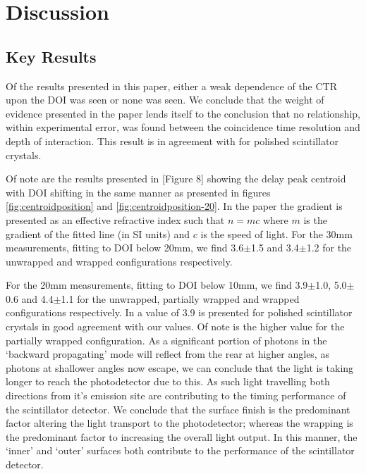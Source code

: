 \section{Discussion}
\subsection{Key Results}
Of the results presented in this paper, either a weak dependence of the CTR upon the DOI was seen or none was seen. We conclude that the weight of evidence presented in the paper lends itself to the conclusion that no relationship, within experimental error, was found between the coincidence time resolution and depth of interaction. This result is in agreement with \cite{Bircher_Shao_2012} for polished scintillator crystals. 


Of note are the results presented in [Figure 8]\cite{Moses_Derenzo_1999} showing the delay peak centroid with DOI shifting in the same manner as presented in figures \ref{fig:centroidposition} and \ref{fig:centroidposition-20}. In the paper the gradient is presented as an effective refractive index such that $n=mc$ where $m$ is the gradient of the fitted line (in SI units) and $c$ is the speed of light. For the 30mm measurements, fitting to DOI below 20mm, we find 3.6$\pm$1.5 and 3.4$\pm$1.2 for the unwrapped and wrapped configurations respectively. 


For the 20mm measurements, fitting to DOI below 10mm, we find 3.9$\pm$1.0, 5.0$\pm$0.6 and 4.4$\pm$1.1 for the unwrapped, partially wrapped and wrapped configurations respectively. In \cite{Moses_Derenzo_1999} a value of 3.9 is presented for polished scintillator crystals in good agreement with our values. Of note is the higher value for the partially wrapped configuration. As a significant portion of photons in the `backward propagating' mode will reflect from the rear at higher angles, as photons at shallower angles now escape, we can conclude that the light is taking longer to reach the photodetector due to this. As such light travelling both directions from it's emission site are contributing to the timing performance of the scintillator detector. We conclude that the surface finish is the predominant factor altering the light transport to the photodetector; whereas the wrapping is the predominant factor to increasing the overall light output. In this manner, the `inner' and `outer' surfaces both contribute to the performance of the scintillator detector.